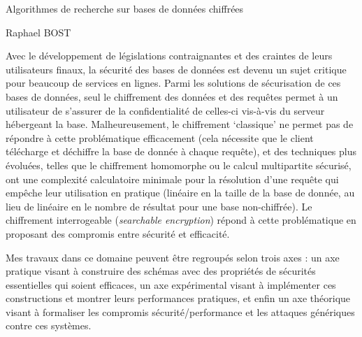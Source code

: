 \documentclass[a4]{article}
\begin{document}

\begin{center}
    {\LARGE Algorithmes de recherche sur bases de données chiffrées}
    \vspace{1em}

    {\large Raphael BOST}
\end{center}





Avec le développement de législations contraignantes et des craintes de leurs utilisateurs finaux, la sécurité des bases de données est devenu un sujet critique pour beaucoup de services en lignes.
Parmi les solutions de sécurisation de ces bases de données, seul le chiffrement des données et des requêtes permet à un utilisateur de s'assurer de la confidentialité de celles-ci vis-à-vis du serveur hébergeant la base.
%
Malheureusement, le chiffrement `classique' ne permet pas de répondre à cette problématique efficacement (cela nécessite que le client télécharge et déchiffre la base de donnée à chaque requête), et des techniques plus évoluées, telles que le chiffrement homomorphe ou le calcul multipartite sécurisé, ont une complexité calculatoire minimale pour la résolution d'une requête qui empêche leur utilisation en pratique (linéaire en la taille de la base de donnée, au lieu de linéaire en le nombre de résultat pour une base non-chiffrée).
Le chiffrement interrogeable (\emph{searchable encryption}) %
répond à cette problématique en proposant des compromis entre sécurité et efficacité.

Mes travaux dans ce domaine peuvent être regroupés selon trois axes : un axe pratique visant à construire des schémas avec des propriétés de sécurités essentielles qui soient efficaces, un axe expérimental visant à implémenter ces constructions et montrer leurs performances pratiques, et enfin un axe théorique visant à formaliser les compromis sécurité/performance et les attaques génériques contre ces systèmes.

\end{document}
